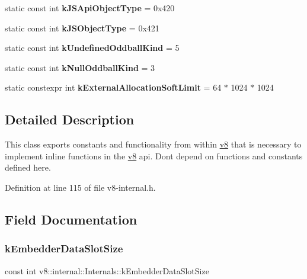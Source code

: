 \begin{DoxyCompactItemize}
static const int {\bfseries k\+J\+S\+Api\+Object\+Type} = 0x420
\item 
\mbox{\label{classv8_1_1internal_1_1Internals_a56b7062df5d9a7df491137d4c3341bcc}} 
static const int {\bfseries k\+J\+S\+Object\+Type} = 0x421
\item 
\mbox{\label{classv8_1_1internal_1_1Internals_a39072b9e0ffea4031f4a1c514208b20d}} 
static const int {\bfseries k\+Undefined\+Oddball\+Kind} = 5
\item 
\mbox{\label{classv8_1_1internal_1_1Internals_a72243c5512cb5cab9d10b6f29e775180}} 
static const int {\bfseries k\+Null\+Oddball\+Kind} = 3
\item 
\mbox{\label{classv8_1_1internal_1_1Internals_af85a33cd47a2c9ed5faa4e1a85a6afce}} 
static constexpr int {\bfseries k\+External\+Allocation\+Soft\+Limit} = 64 $\ast$ 1024 $\ast$ 1024
\end{DoxyCompactItemize}


\subsection{Detailed Description}
This class exports constants and functionality from within \mbox{\hyperlink{namespacev8}{v8}} that is necessary to implement inline functions in the \mbox{\hyperlink{namespacev8}{v8}} api. Don\textquotesingle{}t depend on functions and constants defined here. 

Definition at line 115 of file v8-\/internal.\+h.



\subsection{Field Documentation}
\mbox{\label{classv8_1_1internal_1_1Internals_a0947f712baffcb6772bd5e2ac5a47e1d}} 
\subsubsection{\texorpdfstring{k\+Embedder\+Data\+Slot\+Size}{kEmbedderDataSlotSize}}
{\footnotesize\ttfamily const int v8\+::internal\+::\+Internals\+::k\+Embedder\+Data\+Slot\+Size\hspace{0.3cm}{\ttfamily [static]}}

